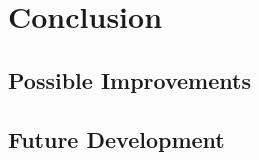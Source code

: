 \chapter{Conclusion} 
\label{chap:conclusion}

\section{Possible Improvements}
\section{Future Development}